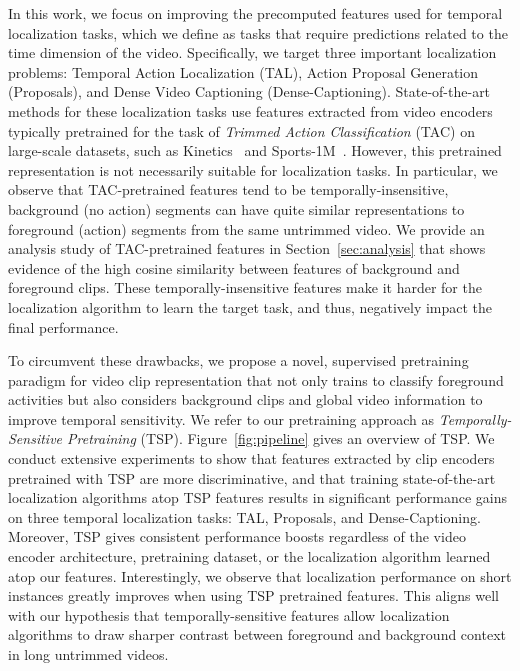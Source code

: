 \documentclass[10pt,twocolumn,letterpaper]{article}
\begin{document}
In this work, we focus on improving the precomputed features used for temporal localization tasks, which we define as tasks that require predictions related to the time dimension of the video. Specifically, we target three important localization problems: Temporal Action Localization (TAL), Action Proposal Generation (Proposals), and Dense Video Captioning (Dense-Captioning). State-of-the-art methods for these localization tasks use features extracted from video encoders typically pretrained for the task of \emph{Trimmed Action Classification} (TAC) on large-scale datasets, such as Kinetics~\cite{dataset_kinetics} and Sports-1M~\cite{dataset_sports1m}. However, this pretrained representation is not necessarily suitable for localization tasks. In particular, we observe that TAC-pretrained features tend to be temporally-insensitive, \ie background (no action) segments can have quite similar representations to foreground (action) segments from the same untrimmed video. We provide an analysis study of TAC-pretrained features in Section~\ref{sec:analysis} that shows evidence of the high cosine similarity between features of background and foreground clips. These temporally-insensitive features make it harder for the localization algorithm to learn the target task, and thus, negatively impact the final performance.


To circumvent these drawbacks, we propose a novel, supervised pretraining paradigm for video clip representation that not only trains to classify foreground activities but also considers background clips and global video information to improve temporal sensitivity. We refer to our pretraining approach as \emph{Temporally-Sensitive Pretraining} (TSP). Figure~\ref{fig:pipeline} gives an overview of TSP. We conduct extensive experiments to show that features extracted by clip encoders pretrained with TSP are more discriminative, and that training state-of-the-art localization algorithms atop TSP features results in significant performance gains on three temporal localization tasks: TAL, Proposals, and Dense-Captioning. Moreover, TSP gives consistent performance boosts regardless of the video encoder architecture, pretraining dataset, or the localization algorithm learned atop our features. Interestingly, we observe that localization performance on short instances greatly improves when using TSP pretrained features. This aligns well with our hypothesis that temporally-sensitive features allow localization algorithms to draw sharper contrast between foreground and background context in long untrimmed videos.
\end{document}
